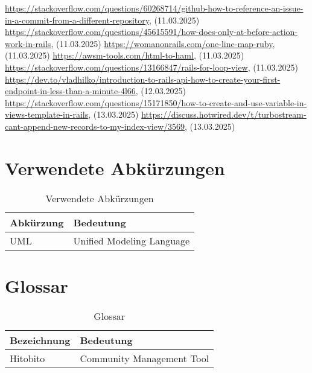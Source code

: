 \begin{thebibliography}{9}
     \url{https://stackoverflow.com/questions/60268714/github-how-to-reference-an-issue-in-a-commit-from-a-different-repository}, (11.03.2025)
     \url{https://stackoverflow.com/questions/45615591/how-does-only-at-before-action-work-in-rails}, (11.03.2025)
     \url{https://womanonrails.com/one-line-map-ruby}, (11.03.2025)
     \url{https://awsm-tools.com/html-to-haml}, (11.03.2025)
     \url{https://stackoverflow.com/questions/13166847/rails-for-loop-view}, (11.03.2025)
     \url{https://dev.to/vladhilko/introduction-to-rails-api-how-to-create-your-first-endpoint-in-less-than-a-minute-4l66}, (12.03.2025)
     \url{https://stackoverflow.com/questions/15171850/how-to-create-and-use-variable-in-views-template-in-rails}, (13.03.2025)
     \url{https://discuss.hotwired.dev/t/turbostream-cant-append-new-records-to-my-index-view/3569}, (13.03.2025)
    
\end{thebibliography}

\chapter{Verwendete Abkürzungen}

\begin{table}[H]
    \begin{tabular}{|L{0.3\textwidth}|L{0.6\textwidth}|}
        \hline
         \textbf{\color{white}Abkürzung} & \textbf{\color{white}Bedeutung} \\[12pt]
        \hline
        UML & Unified Modeling Language \\
        \hline
    \end{tabular}
    \caption{Verwendete Abkürzungen}
\end{table}

\chapter{Glossar}

\begin{table}[H]
    \begin{tabular}{|L{0.3\textwidth}|L{0.6\textwidth}|}
        \hline
         \textbf{\color{white}Bezeichnung} & \textbf{\color{white}Bedeutung} \\[12pt]
        \hline
        Hitobito & Community Management Tool \\
        \hline
    \end{tabular}
    \caption{Glossar}
\end{table}

